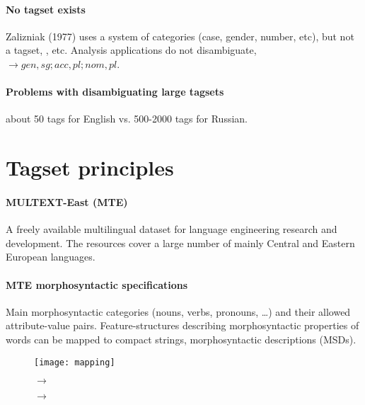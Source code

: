 \documentclass[largefonts]{sciposter}
\begin{document}
\begin{multicols}{2}
\paragraph{No tagset exists} Zalizniak (1977) uses a system of categories (case, gender, number, etc), but not a tagset, \eg {}, etc.  Analysis applications do not disambiguate, \eg{} $\rightarrow gen,sg;acc,pl;nom,pl$.

\paragraph{Problems with disambiguating large tagsets}  about 50 tags for English vs. 500-2000 tags for Russian.

\section{Tagset principles}

\paragraph{MULTEXT-East (MTE)} A freely available multilingual dataset for
language engineering research and development. The resources cover a
large number of mainly Central and Eastern European languages.

\paragraph{MTE morphosyntactic specifications} Main morphosyntactic categories (nouns, verbs, pronouns, \ldots) and their
allowed attribute-value pairs.  Feature-structures describing
morphosyntactic properties of words can be mapped to compact strings,
morphosyntactic descriptions (MSDs). 

\begin{figure}[h]

  \begin{center}
    \texttt{[image: mapping]}
  \end{center}

    $\rightarrow$   

    $\rightarrow$  

\end{figure}


\end{multicols}
\end{document}
